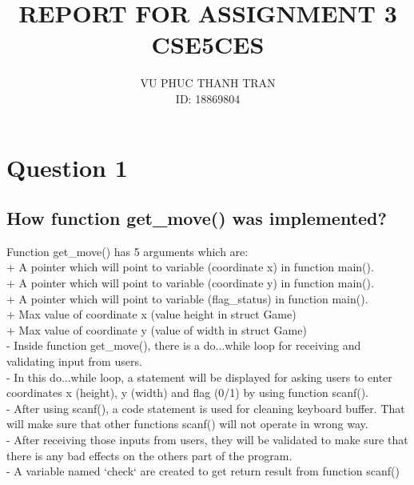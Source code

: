 \documentclass[a4paper,12pt]{article}
\begin{document}
\title{REPORT FOR ASSIGNMENT 3\\CSE5CES}
\author{VU PHUC THANH TRAN\\ID: 18869804}
\maketitle{}
\newpage{}
\section*{Question 1}
\subsection*{How function get\_move() was implemented?}
Function get\_move() has 5 arguments which are:\\ \newline{}
\hspace*{1cm}+ A pointer which will point to variable (coordinate x) in function main().\\
\hspace*{1cm}+ A pointer which will point to variable (coordinate y) in function main().\\
\hspace*{1cm}+ A pointer which will point to variable (flag\_status) in function main().\\
\hspace*{1cm}+ Max value of coordinate x (value height in struct Game)\\
\hspace*{1cm}+ Max value of coordinate y (value of width in struct Game)\\
\newline{}
\noindent
- Inside function get\_move(), there is a do...while loop for receiving and validating input from users.\\
- In this do...while loop, a statement will be displayed for asking users to enter coordinates x (height), y (width) and flag (0/1) by using function scanf().\\
- After using scanf(), a code statement is used for cleaning keyboard buffer. That will make sure that other functions scanf() will not operate in wrong way.\\
- After receiving those inputs from users, they will be validated to make sure that there is any bad effects on the others part of the program.\\
\newline{}
- A variable named `check` are created to get return result from function scanf()\\
\end{document}
